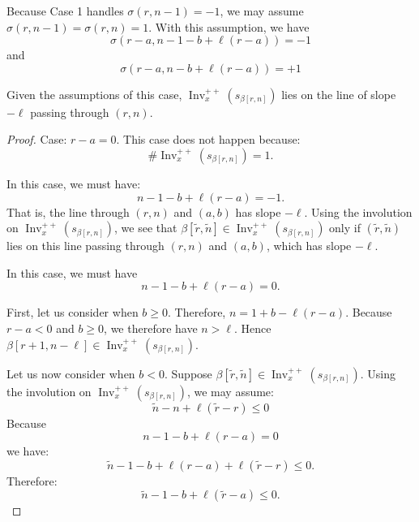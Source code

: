 \documentclass[ALCO,ThmDefs,Unicode]{cedram}
\DeclareMathOperator{\Inv}{Inv}
\newcommand{\Invplusplusx}{\Inv^{++}_x}
\newcommand{\tr}{\widetilde{r}}
\newcommand{\tn}{\widetilde{n}}
\begin{document}
Because Case 1 handles $\sigma(r,n-1)=-1$, we may assume $\sigma(r,n-1) = \sigma(r,n) = 1$. With this assumption, we have
\begin{equation}\label{eq:44}
\sigma(r-a,n-1-b+\ell(r-a)) = -1
\end{equation}
and
\begin{equation}\label{eq:45}
\sigma(r-a,n-b+\ell(r-a)) = +1
\end{equation}

\begin{prop}\label{prop:inv-on-slope-of-neg-ell}
Given the assumptions of this case, $\Invplusplusx(s_{\beta[r,n]})$ lies on the line of slope $-\ell$ passing through $(r,n)$.
\end{prop}

\begin{proof}
{Case: $r- a = 0$.} This case does not happen because:
\begin{equation}\label{eq:106}
\#\Invplusplusx(s_{\beta[r,n]}) = 1.
\end{equation}

 In this case, we must have:
\begin{equation}\label{eq:46}
n-1-b+\ell(r-a) = -1.
\end{equation}
That is, the line through $(r,n)$ and $(a,b)$ has slope $-\ell$. Using the involution on $\Invplusplusx(s_{\beta[r,n]})$, we see that $\beta[\tr,\tn] \in \Invplusplusx(s_{\beta[r,n]})$ only if $(\tr,\tn)$ lies on this line passing through $(r,n)$ and $(a,b)$, which has slope $-\ell$.

 In this case, we must have
\begin{equation}\label{eq:47}
n-1-b+\ell(r-a) = 0.
\end{equation}

First, let us consider when $b \geq 0$. Therefore, $n= 1+b - \ell(r-a)$. Because $r-a <0$ and $b \geq 0$, we therefore have $n > \ell$. Hence $\beta[r+1, n- \ell] \in \Invplusplusx(s_{\beta[r,n]})$.

Let us now consider when $b < 0$. Suppose $\beta[\tr,\tn] \in \Invplusplusx(s_{\beta[r,n]})$. Using the involution on $\Invplusplusx(s_{\beta[r,n]})$, we may assume:
\begin{equation}\label{eq:92}
\tn - n + \ell(\tr -r) \leq 0
\end{equation}
Because
\begin{equation}\label{eq:93}
n-1-b+\ell(r-a) = 0
\end{equation}
we have:
\begin{equation}\label{eq:94}
\tn -1-b+\ell(r-a) + \ell(\tr -r) \leq 0.
\end{equation}
Therefore:
\begin{equation}\label{eq:95}
\tn -1-b+ \ell(\tr -a) \leq 0.
\end{equation}


\end{proof}
\end{document}
